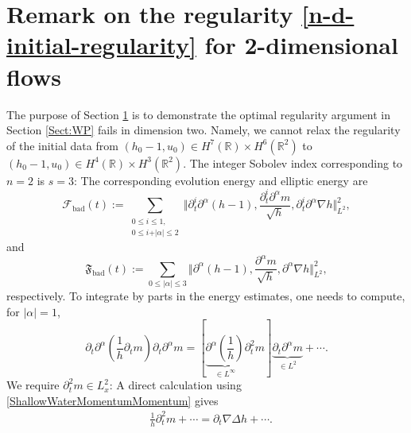 \documentclass[reqno,11pt]{amsart}
\newcommand{\norm}[2]{\Vert #1 \Vert_{#2}}
\DeclareMathOperator{\Div}{div}
\theoremstyle{plain}
\theoremstyle{definition}
\numberwithin{equation}{section}
\begin{document}
\section{Remark on the regularity \eqref{n-d-initial-regularity} for 2-dimensional flows}
\label{Regularity-remark}
The purpose of Section \ref{Regularity-remark} is to demonstrate the optimal regularity argument in Section \ref{Sect:WP} fails in dimension two. Namely, we cannot relax the regularity of the initial data from $(h_0 -1, u_0) \in H^7(\mathbb{R})\times H^6(\mathbb{R}^2)$ to $(h_0 -1, u_0) \in H^4(\mathbb{R})\times H^3(\mathbb{R}^2)$. The integer Sobolev index corresponding to $n=2$ is $s=3$: The corresponding evolution energy and elliptic energy are
\begin{equation}
    \label{EnergyEvolution-Odd}
    \mathcal{F}_{\text{bad}} (t):=\sum_{\substack{0\leq i\leq 1, \\ 0\leq i+\vert\alpha\vert\leq 2}}\norm{\partial_t^i\partial^{\alpha}(h-1),\frac{\partial_t^i \partial^{\alpha} m}{\sqrt{h}},\partial_t^i \partial^{\alpha}  \nabla h}{L^2}^2,
\end{equation}
and 
\begin{equation}
    \label{EnergyElliptic-Odd}
    \mathfrak{F}_{\text{bad}}(t):=\sum_{0\leq \vert \alpha \vert \leq 3} \norm{\partial^{\alpha}(h-1),\frac{\partial^{\alpha}m}{\sqrt{h}}, \partial^{\alpha}\nabla h}{L^2}^2,
\end{equation}
respectively. To integrate by parts in the energy estimates, one needs to compute, for $\vert \alpha \vert=1$,
\begin{equation}
    \partial_t\partial^{\alpha} \left(\frac{1}{h}\partial_t m\right) \partial_t\partial^{\alpha} m=[\underbrace{\partial^{\alpha} \left(\frac{1}{h}\right)}_{\in L^{\infty}} \boxed{\partial_t^2 m} ]\underbrace{\partial_t\partial^{\alpha} m}_{\in L^2} +\cdots .%
\end{equation}
We require $\partial_t^2m\in L_x^2$: A direct calculation using \eqref{ShallowWaterMomentumMomentum} gives
\begin{equation}
\label{2-time-diff-momentum}
\begin{aligned}
   & \frac{1}{h}{\partial_t^2 m}+\cdots %
   ={\partial_t \nabla \Delta h}+\cdots . %
\end{aligned}
\end{equation}
\end{document}
